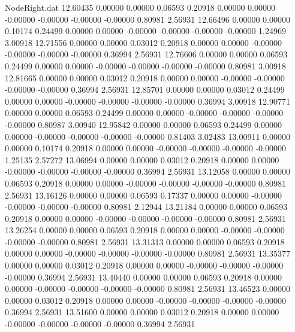 \begin{filecontents}{NodeRight.dat}
  12.60435    0.00000    0.00000     0.06593    0.20918    0.00000    0.00000   -0.00000   -0.00000   -0.00000   -0.00000    0.80981    2.56931
  12.66496    0.00000    0.00000     0.10174    0.24499    0.00000    0.00000   -0.00000   -0.00000   -0.00000   -0.00000    1.24969    3.00918
  12.71556    0.00000    0.00000     0.03012    0.20918    0.00000    0.00000   -0.00000   -0.00000   -0.00000   -0.00000    0.36994    2.56931
  12.76606    0.00000    0.00000     0.06593    0.24499    0.00000    0.00000   -0.00000   -0.00000   -0.00000   -0.00000    0.80981    3.00918
  12.81665    0.00000    0.00000     0.03012    0.20918    0.00000    0.00000   -0.00000   -0.00000   -0.00000   -0.00000    0.36994    2.56931
  12.85701    0.00000    0.00000     0.03012    0.24499    0.00000    0.00000   -0.00000   -0.00000   -0.00000   -0.00000    0.36994    3.00918
  12.90771    0.00000    0.00000     0.06593    0.24499    0.00000    0.00000   -0.00000   -0.00000   -0.00000   -0.00000    0.80987    3.00940
  12.95842    0.00000    0.00000     0.06593    0.24499    0.00000    0.00000   -0.00000   -0.00000   -0.00000   -0.00000    0.81403    3.02483
  13.00911    0.00000    0.00000     0.10174    0.20918    0.00000    0.00000   -0.00000   -0.00000   -0.00000   -0.00000    1.25135    2.57272
  13.06994    0.00000    0.00000     0.03012    0.20918    0.00000    0.00000   -0.00000   -0.00000   -0.00000   -0.00000    0.36994    2.56931
  13.12058    0.00000    0.00000     0.06593    0.20918    0.00000    0.00000   -0.00000   -0.00000   -0.00000   -0.00000    0.80981    2.56931
  13.16126    0.00000    0.00000     0.06593    0.17337    0.00000    0.00000   -0.00000   -0.00000   -0.00000   -0.00000    0.80981    2.12944
  13.21184    0.00000    0.00000     0.06593    0.20918    0.00000    0.00000   -0.00000   -0.00000   -0.00000   -0.00000    0.80981    2.56931
  13.26254    0.00000    0.00000     0.06593    0.20918    0.00000    0.00000   -0.00000   -0.00000   -0.00000   -0.00000    0.80981    2.56931
  13.31313    0.00000    0.00000     0.06593    0.20918    0.00000    0.00000   -0.00000   -0.00000   -0.00000   -0.00000    0.80981    2.56931
  13.35377    0.00000    0.00000     0.03012    0.20918    0.00000    0.00000   -0.00000   -0.00000   -0.00000   -0.00000    0.36994    2.56931
  13.40440    0.00000    0.00000     0.06593    0.20918    0.00000    0.00000   -0.00000   -0.00000   -0.00000   -0.00000    0.80981    2.56931
  13.46523    0.00000    0.00000     0.03012    0.20918    0.00000    0.00000   -0.00000   -0.00000   -0.00000   -0.00000    0.36994    2.56931
  13.51600    0.00000    0.00000     0.03012    0.20918    0.00000    0.00000   -0.00000   -0.00000   -0.00000   -0.00000    0.36994    2.56931

\end{filecontents}
